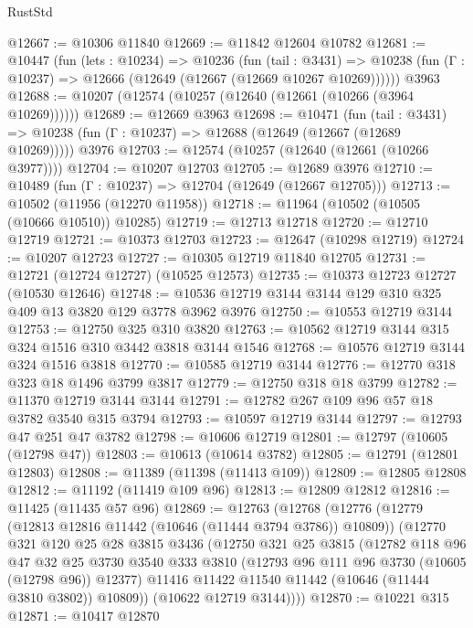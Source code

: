 \begin{lexlean}{RustStd}
\begin{coremodule}
@12667 := @10306 @11840
@12669 := @11842 @12604 @10782
@12681 := @10447
    (fun (lets : @10234) =>
    @10236
      (fun (tail : @3431) =>
      @10238 (fun (Γ : @10237) => @12666 (@12649 (@12667 (@12669 @10267 @10269))))))
    @3963
@12688 := @10207 (@12574 (@10257 (@12640 (@12661 (@10266 (@3964 @10269))))))
@12689 := @12669 @3963
@12698 := @10471
    (fun (tail : @3431) => @10238 (fun (Γ : @10237) => @12688 (@12649 (@12667 (@12689 @10269)))))
    @3976
@12703 := @12574 (@10257 (@12640 (@12661 (@10266 @3977))))
@12704 := @10207 @12703
@12705 := @12689 @3976
@12710 := @10489 (fun (Γ : @10237) => @12704 (@12649 (@12667 @12705)))
@12713 := @10502 (@11956 (@12270 @11958))
@12718 := @11964 (@10502 (@10505 (@10666 @10510)) @10285)
@12719 := @12713 @12718
@12720 := @12710 @12719
@12721 := @10373 @12703
@12723 := @12647 (@10298 @12719)
@12724 := @10207 @12723
@12727 := @10305 @12719 @11840 @12705
@12731 := @12721 (@12724 @12727) (@10525 @12573)
@12735 := @10373 @12723 @12727 (@10530 @12646)
@12748 := @10536 @12719 @3144 @3144 @129 @310 @325 @409 @13 @3820 @129 @3778 @3962 @3976
@12750 := @10553 @12719 @3144
@12753 := @12750 @325 @310 @3820
@12763 := @10562 @12719 @3144 @315 @324 @1516 @310 @3442 @3818 @3144 @1546
@12768 := @10576 @12719 @3144 @324 @1516 @3818
@12770 := @10585 @12719 @3144
@12776 := @12770 @318 @323 @18 @1496 @3799 @3817
@12779 := @12750 @318 @18 @3799
@12782 := @11370 @12719 @3144 @3144
@12791 := @12782 @267 @109 @96 @57 @18 @3782 @3540 @315 @3794
@12793 := @10597 @12719 @3144
@12797 := @12793 @47 @251 @47 @3782
@12798 := @10606 @12719
@12801 := @12797 (@10605 (@12798 @47))
@12803 := @10613 (@10614 @3782)
@12805 := @12791 (@12801 @12803)
@12808 := @11389 (@11398 (@11413 @109))
@12809 := @12805 @12808
@12812 := @11192 (@11419 @109 @96)
@12813 := @12809 @12812
@12816 := @11425 (@11435 @57 @96)
@12869 := @12763
    (@12768
      (@12776
        (@12779 (@12813 @12816 @11442 (@10646 (@11444 @3794 @3786)) @10809))
        (@12770
          @321
          @120
          @25
          @28
          @3815
          @3436
          (@12750
            @321
            @25
            @3815
            (@12782
              @118
              @96
              @47
              @32
              @25
              @3730
              @3540
              @333
              @3810
              (@12793 @96 @111 @96 @3730 (@10605 (@12798 @96)) @12377)
              @11416
              @11422
              @11540
              @11442
              (@10646 (@11444 @3810 @3802))
              @10809))
          (@10622 @12719 @3144))))
@12870 := @10221 @315
@12871 := @10417 @12870

\end{coremodule}
\end{lexlean}
